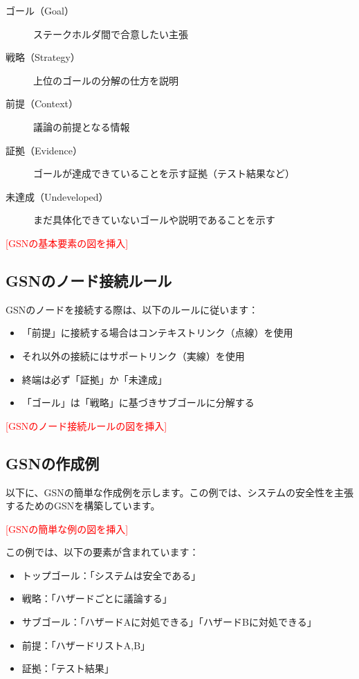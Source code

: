 \begin{description}
    \item[ゴール（Goal）] ステークホルダ間で合意したい主張
    \item[戦略（Strategy）] 上位のゴールの分解の仕方を説明
    \item[前提（Context）] 議論の前提となる情報
    \item[証拠（Evidence）] ゴールが達成できていることを示す証拠（テスト結果など）
    \item[未達成（Undeveloped）] まだ具体化できていないゴールや説明であることを示す
\end{description}

\textcolor{red}{[GSNの基本要素の図を挿入]}

\subsection{GSNのノード接続ルール}

GSNのノードを接続する際は、以下のルールに従います：

\begin{itemize}
    \item 「前提」に接続する場合はコンテキストリンク（点線）を使用
    \item それ以外の接続にはサポートリンク（実線）を使用
    \item 終端は必ず「証拠」か「未達成」
    \item 「ゴール」は「戦略」に基づきサブゴールに分解する
\end{itemize}

\textcolor{red}{[GSNのノード接続ルールの図を挿入]}

\subsection{GSNの作成例}

以下に、GSNの簡単な作成例を示します。この例では、システムの安全性を主張するためのGSNを構築しています。

\textcolor{red}{[GSNの簡単な例の図を挿入]}

この例では、以下の要素が含まれています：

\begin{itemize}
    \item トップゴール：「システムは安全である」
    \item 戦略：「ハザードごとに議論する」
    \item サブゴール：「ハザードAに対処できる」「ハザードBに対処できる」
    \item 前提：「ハザードリストA,B」
    \item 証拠：「テスト結果」
\end{itemize}

